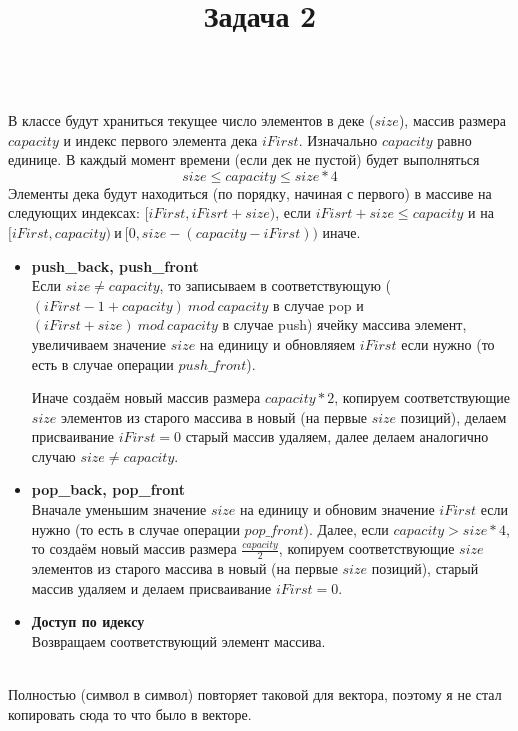 \documentclass{article}
\title{Задача 2}
\date{}
\begin{document}
\maketitle

\Large
{\\}
В классе будут храниться текущее число элементов в деке ($size$), массив размера $capacity$ и индекс первого элемента дека $iFirst$. Изначально $capacity$ равно единице. В каждый момент времени (если дек не пустой) будет выполняться
$$size \leqslant capacity \leqslant size*4$$
Элементы дека будут находиться (по порядку, начиная с первого) в массиве на следующих индексах: $[iFirst, iFisrt+size)$, если $iFisrt + size \leqslant capacity$ и на \\$[iFirst,capacity)\ и\ [0,size-(capacity-iFirst))$ иначе.

\begin{itemize}
\item \textbf{push\_back, push\_front}\\
	Если $size\neq capacity$, то записываем в соответствующую ($(iFirst-1+capacity)\ mod\ capacity$ в случае pop и $(iFirst+size)\ mod\ capacity$ в случае push) ячейку массива элемент, увеличиваем значение $size$ на единицу и обновляяем $iFirst$ если нужно (то есть в случае операции $push\_front$).
	
	Иначе создаём новый массив размера ${capacity*2}$, копируем соответствующие $size$ элементов из старого массива в новый (на первые $size$ позиций), делаем присваивание $iFirst=0$ старый массив удаляем, далее делаем аналогично случаю ${size \neq capacity}$.
\item \textbf{pop\_back, pop\_front}\\
	Вначале уменьшим значение $size$ на единицу и обновим значение $iFirst$ если нужно (то есть в случае операции $pop\_front$). Далее, если $capacity > size*4$, то создаём новый массив размера ${\frac{capacity}{2}}$, копируем соответствующие $size$ элементов из старого массива в новый (на первые $size$ позиций), старый массив удаляем и делаем присваивание $iFirst=0$.
\item \textbf{Доступ по идексу}\\
	Возвращаем соответствующий элемент массива.
\end{itemize}

{\\}
	Полностью (символ в символ) повторяет таковой для вектора, поэтому я не стал копировать сюда то что было в векторе.
\end{document}
